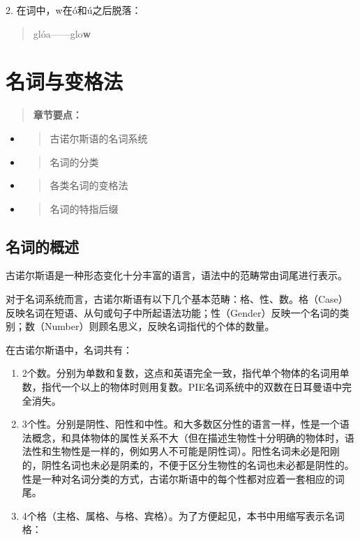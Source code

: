2. 在词中，w在ó和ú之后脱落：

\begin{quote}
  glóa------glo\textbf{w}
\end{quote}

\chapter{名词与变格法}\label{名词与变格法}

\begin{quote}
  \textbf{章节要点：}
\end{quote}

\begin{itemize}
  \item
        \begin{quote}
          古诺尔斯语的名词系统
        \end{quote}
  \item
        \begin{quote}
          名词的分类
        \end{quote}
  \item
        \begin{quote}
          各类名词的变格法
        \end{quote}
  \item
        \begin{quote}
          名词的特指后缀
        \end{quote}
\end{itemize}

\section{名词的概述}\label{名词的概述}

古诺尔斯语是一种形态变化十分丰富的语言，语法中的范畴常由词尾进行表示。

对于名词系统而言，古诺尔斯语有以下几个基本范畴：格、性、数。格（Case）反映名词在短语、从句或句子中所起语法功能；性（Gender）反映一个名词的类别；数（Number）则顾名思义，反映名词指代的个体的数量。

在古诺尔斯语中，名词共有：

\begin{enumerate}
  \def\labelenumi{\arabic{enumi})}
  \item
        2个数。分别为单数和复数，这点和英语完全一致，指代单个物体的名词用单数，指代一个以上的物体时则用复数。PIE名词系统中的双数在日耳曼语中完全消失。
  \item
        3个性。分别是阴性、阳性和中性。和大多数区分性的语言一样，性是一个语法概念，和具体物体的属性关系不大（但在描述生物性十分明确的物体时，语法性和生物性是一样的，例如男人不可能是阴性词）。阳性名词未必是阳刚的，阴性名词也未必是阴柔的，不便于区分生物性的名词也未必都是阴性的。性是一种对名词分类的方式，古诺尔斯语中的每个性都对应着一套相应的词尾。
  \item
        4个格（主格、属格、与格、宾格）。为了方便起见，本书中用缩写表示名词格：
\end{enumerate}

